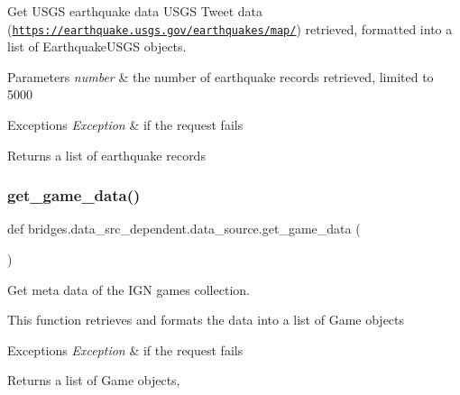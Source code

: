 Get U\+S\+GS earthquake data U\+S\+GS Tweet data (\href{https://earthquake.usgs.gov/earthquakes/map/}{\tt https\+://earthquake.\+usgs.\+gov/earthquakes/map/}) retrieved, formatted into a list of Earthquake\+U\+S\+GS objects. 


\begin{DoxyParams}{Parameters}
{\em number} & the number of earthquake records retrieved, limited to 5000 \\
\hline
\end{DoxyParams}

\begin{DoxyExceptions}{Exceptions}
{\em Exception} & if the request fails\\
\hline
\end{DoxyExceptions}
\begin{DoxyReturn}{Returns}
a list of earthquake records 
\end{DoxyReturn}
\mbox{\label{namespacebridges_1_1data__src__dependent_1_1data__source_a31b64b8c7a42cdfca0a5f0ae3da187d2}} 
\subsubsection{\texorpdfstring{get\+\_\+game\+\_\+data()}{get\_game\_data()}}
{\footnotesize\ttfamily def bridges.\+data\+\_\+src\+\_\+dependent.\+data\+\_\+source.\+get\+\_\+game\+\_\+data (\begin{DoxyParamCaption}{ }\end{DoxyParamCaption})}



Get meta data of the I\+GN games collection. 

This function retrieves and formats the data into a list of Game objects


\begin{DoxyExceptions}{Exceptions}
{\em Exception} & if the request fails\\
\hline
\end{DoxyExceptions}
\begin{DoxyReturn}{Returns}
a list of Game objects, 
\end{DoxyReturn}
\mbox{\label{namespacebridges_1_1data__src__dependent_1_1data__source_af377da50c8f4e488b832978908274089}} 

